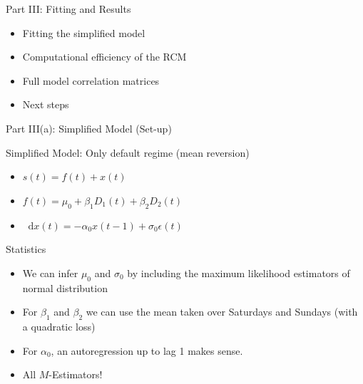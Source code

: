 \documentclass{beamer}
\newcommand*\dif{\mathop{}\!\mathrm{d}}
\begin{document}
\begin{frame}{Part III: Fitting and Results}

\begin{itemize}
    \item Fitting the simplified model
    \item Computational efficiency of the RCM
    \item Full model correlation matrices
    \item Next steps
\end{itemize}
    
\end{frame}

\begin{frame}{Part III(a): Simplified Model (Set-up)}

\begin{block}{Simplified Model: Only default regime (mean reversion)}
    \begin{itemize}
        \item $s(t) = f(t) + x(t)$
        \item $f(t) = \mu_0 + \beta_1 D_1(t) + \beta_2 D_2(t)$
        \item $\dif x(t) = -\alpha_0 x(t-1) + \sigma_0 \epsilon(t)$
    \end{itemize}
\end{block}

\begin{block}{Statistics}
    \begin{itemize}
        \item We can infer $\mu_0$ and $\sigma_0$ by including the maximum likelihood estimators of normal distribution
        \item For $\beta_1$ and $\beta_2$ we can use the mean taken over Saturdays and Sundays (with a quadratic loss)
        \item For $\alpha_0$, an autoregression up to lag 1 makes sense.
        \item All $M$-Estimators!
    \end{itemize}
\end{block}



\end{frame}
\end{document}
